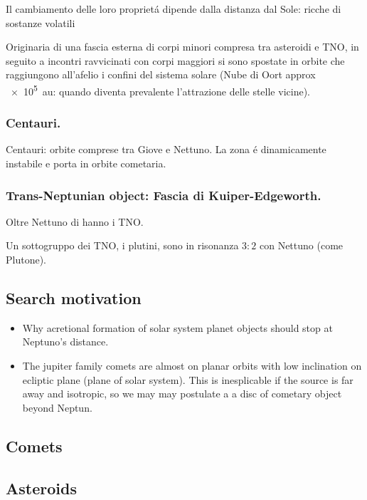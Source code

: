 Il cambiamento delle loro propriet\'a dipende dalla distanza dal Sole: ricche di sostanze volatili

Originaria di una fascia esterna di corpi minori compresa tra asteroidi e TNO, in seguito a incontri ravvicinati con corpi maggiori si sono spostate in orbite che raggiungono all'afelio i confini del sistema solare (Nube di Oort approx \SI{e5}{\astronomicalunit}: quando diventa prevalente l'attrazione delle stelle vicine).

\subsubsection{Centauri.}

Centauri: orbite comprese tra Giove e Nettuno. La zona \'e dinamicamente instabile e porta in orbite cometaria.

\subsubsection{Trans-Neptunian object: Fascia di Kuiper-Edgeworth.}

Oltre Nettuno di hanno i TNO.

Un sottogruppo dei TNO, i plutini, sono in risonanza $3:2$ con Nettuno (come Plutone).

\subsection{Search motivation}

\begin{itemize}
\item Why acretional formation of solar system planet objects should stop at Neptuno's distance.
\item The jupiter family comets are almost on planar orbits with low inclination on ecliptic plane (plane of solar system). This is inesplicable if the source is far away and isotropic, so we may may postulate a a disc of cometary object beyond Neptun.
\end{itemize}

\subsection{Comets}

\subsection{Asteroids}

